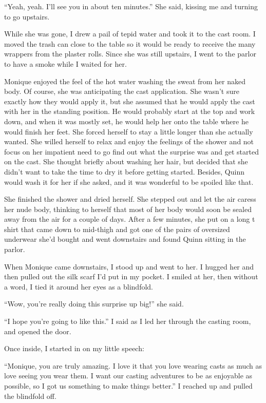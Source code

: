 ``Yeah, yeah. I'll see you in about ten minutes.'' She said, kissing me and turning to go
upstairs.

While she was gone, I drew a pail of tepid water and took it to the cast room. I moved the
trash can close to the table so it would be ready to receive the many wrappers from the plaster
rolls. Since she was still upstairs, I went to the parlor to have a smoke while I waited for
her.

\begin{thought}
Monique enjoyed the feel of the hot water washing the sweat from her naked body. Of course,
she was anticipating the cast application. She wasn't sure exactly how they would apply it, but
she assumed that he would apply the cast with her in the standing position. He would probably
start at the top and work down, and when it was mostly set, he would help her onto the table
where he would finish her feet. She forced herself to stay a little longer than she actually
wanted. She willed herself to relax and enjoy the feelings of the shower and not focus on her
impatient need to go find out what the surprise was and get started on the cast. She thought
briefly about washing her hair, but decided that she didn't want to take the time to dry it
before getting started. Besides, Quinn would wash it for her if she asked, and it was wonderful
to be spoiled like that.

She finished the shower and dried herself. She stepped out and let the air caress her nude
body, thinking to herself that most of her body would soon be sealed away from the air for a
couple of days. After a few minutes, she put on a long t shirt that came down to mid-thigh and
got one of the pairs of oversized underwear she'd bought and went downstairs and found Quinn
sitting in the parlor.
\end{thought}

When Monique came downstairs, I stood up and went to her. I hugged her and then pulled out
the silk scarf I'd put in my pocket. I smiled at her, then without a word, I tied it around her
eyes as a blindfold.

``Wow, you're really doing this surprise up big!'' she said.

``I hope you're going to like this.'' I said as I led her through the casting room, and
opened the door.

Once inside, I started in on my little speech:

``Monique, you are truly amazing. I love it that you love wearing casts as much as love
seeing you wear them. I want our casting adventures to be as enjoyable as possible, so I got us
something to make things better.'' I reached up and pulled the blindfold off.

